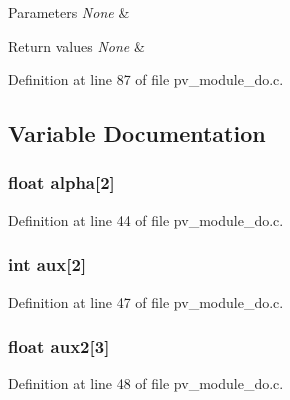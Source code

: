 \begin{DoxyParams}{Parameters}
{\em None} & \\
\hline
\end{DoxyParams}

\begin{DoxyRetVals}{Return values}
{\em None} & \\
\hline
\end{DoxyRetVals}


Definition at line 87 of file pv\+\_\+module\+\_\+do.\+c.



\subsection{Variable Documentation}
\subsubsection[{\texorpdfstring{alpha}{alpha}}]{\setlength{\rightskip}{0pt plus 5cm}float alpha\mbox{[}2\mbox{]}}\hypertarget{group__app__do_gaf2c21f3aed6186d912908dcd33a057d6}{}\label{group__app__do_gaf2c21f3aed6186d912908dcd33a057d6}


Definition at line 44 of file pv\+\_\+module\+\_\+do.\+c.

\subsubsection[{\texorpdfstring{aux}{aux}}]{\setlength{\rightskip}{0pt plus 5cm}int aux\mbox{[}2\mbox{]}}\hypertarget{group__app__do_ga5acd447dc75f4ac13cdac246a2c75291}{}\label{group__app__do_ga5acd447dc75f4ac13cdac246a2c75291}


Definition at line 47 of file pv\+\_\+module\+\_\+do.\+c.

\subsubsection[{\texorpdfstring{aux2}{aux2}}]{\setlength{\rightskip}{0pt plus 5cm}float aux2\mbox{[}3\mbox{]}}\hypertarget{group__app__do_gae93eafaee31c92a65f90bcb26eda96df}{}\label{group__app__do_gae93eafaee31c92a65f90bcb26eda96df}


Definition at line 48 of file pv\+\_\+module\+\_\+do.\+c.

